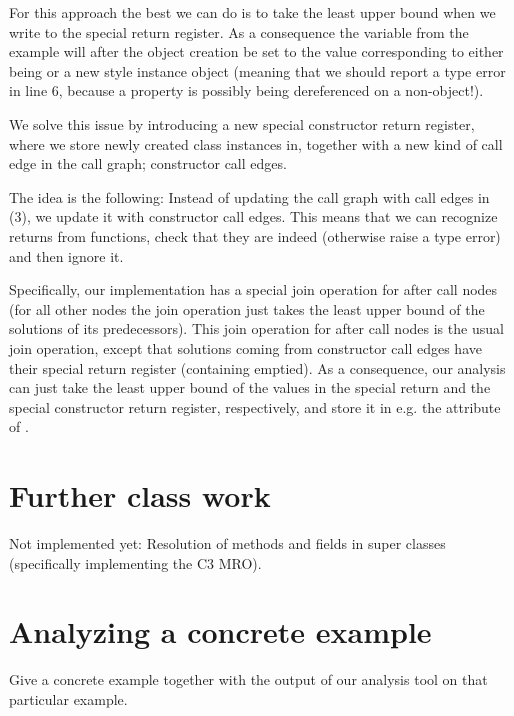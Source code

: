 For this approach the best we can do is to take the least upper bound when we write to the special return register. As a consequence the variable  from the example will after the object creation be set to the value corresponding to either being  or a new style instance object (meaning that we should report a type error in line 6, because a property is possibly being dereferenced on a non-object!).

We solve this issue by introducing a new special constructor return register, where we store newly created class instances in, together with a new kind of call edge in the call graph; constructor call edges.

The idea is the following: Instead of updating the call graph with call edges in (3), we update it with constructor call edges. This means that we can recognize returns from  functions, check that they are indeed  (otherwise raise a type error) and then ignore it.

Specifically, our implementation has a special join operation for after call nodes (for all other nodes the join operation just takes the least upper bound of the solutions of its predecessors). This join operation for after call nodes is the usual join operation, except that solutions coming from constructor call edges have their special return register (containing  emptied). As a consequence, our analysis can just take the least upper bound of the values in the special return and the special constructor return register, respectively, and store it in e.g. the attribute  of .


\section{Further class work}
Not implemented yet: Resolution of methods and fields in super classes (specifically implementing the C3 MRO).

\section{Analyzing a concrete example}
Give a concrete example together with the output of our analysis tool on that particular example.